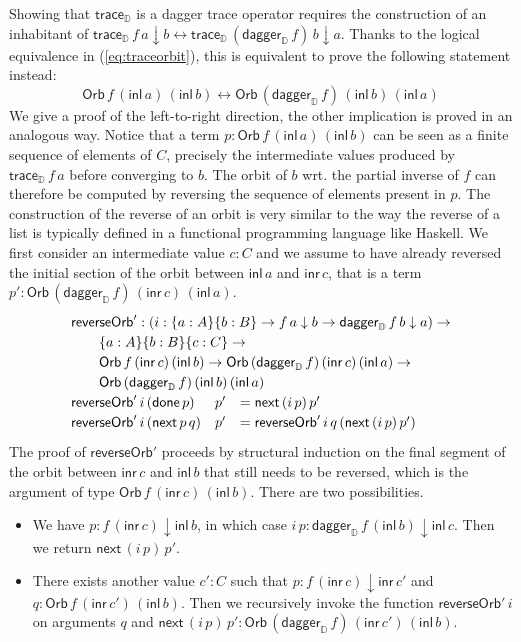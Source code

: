 \documentclass[runningheads,a4paper]{llncs}
\newcommand{\inl}{\mathsf{inl}}
\newcommand{\inr}{\mathsf{inr}}
\newcommand{\dn}{\downarrow}
\newcommand{\D}{\mathbb{D}}
\newcommand{\traceD}{\mathsf{trace}_\D}
\newcommand{\daggerD}{\mathsf{dagger}_\D}
\newcommand{\Orb}[3]{\mathsf{Orb}\,#1\,#2\,#3}
\newcommand{\done}{\mathsf{done}}
\renewcommand{\next}{\mathsf{next}}
\newcommand{\reverseOrbit}{\mathsf{reverseOrb}}
\begin{document}
Showing that $\traceD$ is a dagger trace operator requires the
construction of an inhabitant of $\traceD\,f\,a \dn b \leftrightarrow
\traceD\,(\daggerD\,f)\,b \dn a$. Thanks to the logical equivalence in
(\ref{eq:traceorbit}), this is equivalent to prove the following
statement instead: 
\[
\Orb f {(\inl\,a)} {(\inl\,b)} \leftrightarrow \Orb {(\daggerD\,f)} {(\inl\,b)} {(\inl\,a)}
\]
We give a proof of the left-to-right direction, the other implication
is proved in an analogous way.  Notice that a term
$p : \Orb f {(\inl\,a)} {(\inl\,b)}$ can be seen as a finite sequence
of elements of $C$, precisely the intermediate values produced by
$\traceD\,f\,a$ before converging to $b$. The orbit of $b$ wrt. the
partial inverse of $f$ can therefore be computed by reversing the
sequence of elements present in $p$. The construction of the reverse
of an orbit is very similar to the way the reverse of a list is
typically defined in a functional programming language like Haskell.
We first consider an intermediate value $c : C$ and we assume to have
already reversed the initial section of the orbit between $\inl\,a$
and $\inr\,c$, that is a term $p' : \Orb  {(\daggerD\,f)} {(\inr\,c)}
{(\inl\,a)}$. 
\[
\def\arraystretch{1.2}
\begin{array}{lll}
\multicolumn{3}{l}{\reverseOrbit' : (i : \{a : A\} \{b : B\} \to f \,a
\dn b \to \daggerD\,f  \,b \dn a) \to } \\
\multicolumn{3}{l}{\qquad \{a : A\} \{b : B\} \{c : C\} \to } \\
\multicolumn{3}{l}{\qquad \Orb f {(\inr\,c)}
 {(\inl\,b)} \to \Orb  {(\daggerD\,f)} {(\inr\,c)} {(\inl\,a)} \to } \\
\multicolumn{3}{l}{\qquad \Orb  {(\daggerD\,f)} {(\inl\,b)} {(\inl\,a)}}\\
\reverseOrbit' \,i\, (\done \,p) & p'&= \next\, (i \,p)\,p' \\
\reverseOrbit' \,i\,(\next\,p\,q) & p'&= \reverseOrbit' \,i\,q \,(\next \,(i\,p)\,p')
\end{array}
\]
The proof of $\reverseOrbit'$ proceeds by structural induction on the final
segment of the orbit between $\inr\,c$ and $\inl\,b$ that still needs
to be reversed, which is the argument of type
$\Orb f {(\inr\,c)} {(\inl\,b)}$. There are two possibilities.
\begin{itemize}
\item We have $p : f\,(\inr\,c) \dn
\inl\,b$, in which case $i\,p : \daggerD\,f\,(\inl\,b) \dn
\inl\,c$. Then we return $\next\,(i\,p)\,p'$.
\item There exists another value $c' : C$ such that $p :
  f\,(\inr\,c) \dn \inr\,c'$ and $q : \Orb f {(\inr\,c')}
  {(\inl\,b)}$. Then we recursively invoke the function
  $\reverseOrbit' \,i$ on arguments $q$ and $\next\,(i\,p)\,p' : \Orb
  {(\daggerD \,f)} {(\inr\,c')} {(\inl\,b)}$.
\end{itemize}
\end{document}
